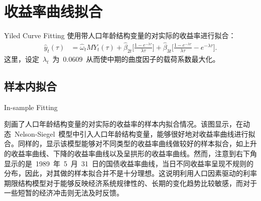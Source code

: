 \section{收益率曲线拟合}{Yiled Curve Fitting}
使用带人口年龄结构变量的\dns 对实际的收益率进行拟合：
 \begin{align}
   \hat{y}_{t}(\tau) & = \hat{\omega}_t MY_{t}(\tau)
        + \hat{\beta}_{2t} \big[\frac{1-e^{-\lambda \tau}} {\lambda \tau} \big]
        + \hat{\beta}_{3t}\big[\frac{1-e^{-\lambda \tau}} {\lambda \tau} - e^{-\lambda \tau} \big].
 \end{align}
 这里，设定~$\lambda_t$~为~$0.0609$~从而使中期的曲度因子的载荷系数最大化\citep{diebold2006forecasting}。

\subsection{样本内拟合}{In-sample Fitting}

 刻画了人口年龄结构变量的\dns 对实际的收益率的样本内拟合情况。该图显示，在动态~Nelson-Siegel~模型中引入人口年龄结构变量，能够很好地对收益率曲线进行拟合。同样的，显示该模型能够对不同类型的收益率曲线做较好的样本拟合，如上升的收益率曲线、下降的收益率曲线以及呈拱形的收益率曲线。然而，注意到右下角显示的是~1989~年~5~月~31~日的国债收益率曲线，当日不同收益率呈现不规则的分布，因此，对其做的样本拟合并不是十分理想。这说明利用人口因素驱动的利率期限结构模型对于能够反映经济系统规律性的、长期的变化趋势比较敏感，而对于一些短暂的经济冲击则无法及时反馈。

